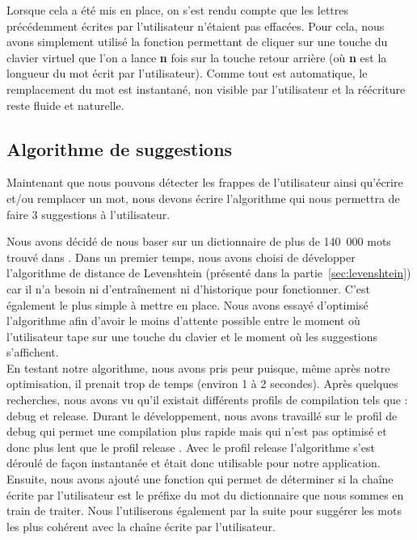 \documentclass[a4paper, 11pt]{report}
\begin{document}
{Lorsque cela a été mis en place, on s'est rendu compte que les lettres précédemment écrites par l'utilisateur n'étaient pas effacées. Pour cela, nous avons simplement utilisé la fonction permettant de cliquer sur une touche du clavier virtuel que l'on a lance \textbf{n} fois sur la touche retour arrière (où \textbf{n} est la longueur du mot écrit par l'utilisateur). Comme tout est automatique, le remplacement du mot est instantané, non visible par l'utilisateur et la réécriture reste fluide et naturelle.

\subsection{Algorithme de suggestions}

Maintenant que nous pouvons détecter les frappes de l'utilisateur ainsi qu'écrire et/ou remplacer un mot, nous devons écrire l'algorithme qui nous permettra de faire 3 suggestions à l'utilisateur.\par \vspace{\baselineskip}

Nous avons décidé de nous baser sur un dictionnaire de plus de 140~000 mots trouvé dans \cite{new2019lexique}. Dans un premier temps, nous avons choisi de développer l'algorithme de distance de Levenshtein (présenté dans la partie~\ref{sec:levenshtein}) car il n'a besoin ni d'entraînement ni d'historique pour fonctionner. C'est également le plus simple à mettre en place. Nous avons essayé d'optimisé l'algorithme afin d'avoir le moins d'attente possible entre le moment où l'utilisateur tape sur une touche du clavier et le moment où les suggestions s'affichent. \\

En testant notre algorithme, nous avons pris peur puisque, même après notre optimisation, il prenait trop de temps (environ 1 à 2 secondes). Après quelques recherches, nous avons vu qu'il existait  différents profils de compilation tels que : \og{}debug \fg{} et \og{}release\fg{}. Durant le développement, nous avons travaillé sur le profil de \og{}debug \fg{} qui permet une compilation plus rapide mais qui n'est pas optimisé et donc plus lent que le profil \og{}release \fg{}. Avec le profil \og{}release \fg{} l'algorithme s'est déroulé de façon instantanée et était donc utilisable pour notre application.\\


Ensuite, nous avons ajouté une fonction qui permet de déterminer si la chaîne écrite par l'utilisateur est le préfixe du mot du dictionnaire que nous sommes en train de traiter. Nous l'utiliserons également par la suite pour suggérer les mots les plus cohérent avec la chaîne écrite par l'utilisateur.\\


}
\end{document}
